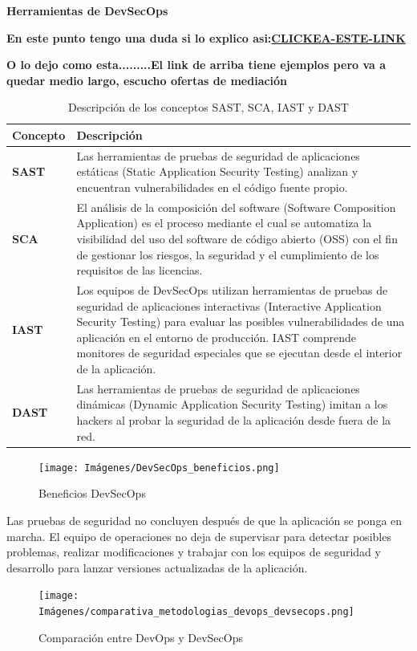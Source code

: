 \textbf{Herramientas de DevSecOps}

\textbf{En este punto tengo una duda si lo explico asi:\href{https://ranjaniitian.medium.com/ensuring-robust-application-security-exploring-sast-dast-and-iast-for-comprehensive-protection-d68b4cf5cf79}{CLICKEA-ESTE-LINK}}

\textbf{O lo dejo como esta.........El link de arriba tiene ejemplos pero va a quedar medio largo, escucho ofertas de mediación}


\begin{table}[ht]
\centering
\begin{tabular}{|m{3cm}|m{11.5cm}|}
\hline
\centering \textbf{Concepto} & \textbf{Descripción} \\ \hline
\centering \textbf{SAST} & Las herramientas de pruebas de seguridad de aplicaciones estáticas (Static Application Security Testing) analizan y encuentran vulnerabilidades en el código fuente propio. \\ \hline
\centering \textbf{SCA} & El análisis de la composición del software (Software Composition Application) es el proceso mediante el cual se automatiza la visibilidad del uso del software de código abierto (OSS) con el fin de gestionar los riesgos, la seguridad y el cumplimiento de los requisitos de las licencias. \\ \hline
\centering \textbf{IAST} & Los equipos de DevSecOps utilizan herramientas de pruebas de seguridad de aplicaciones interactivas (Interactive Application Security Testing) para evaluar las posibles vulnerabilidades de una aplicación en el entorno de producción. IAST comprende monitores de seguridad especiales que se ejecutan desde el interior de la aplicación. \\ \hline
\centering \textbf{DAST} & Las herramientas de pruebas de seguridad de aplicaciones dinámicas (Dynamic Application Security Testing) imitan a los hackers al probar la seguridad de la aplicación desde fuera de la red. \\ \hline
\end{tabular}
\caption{Descripción de los conceptos SAST, SCA, IAST y DAST}
\end{table}


\begin{figure}[ht]
    \centering
    \texttt{[image: Imágenes/DevSecOps\_beneficios.png]}
    \caption{Beneficios DevSecOps}
    \label{fig:beneficiosdevsecops}
\end{figure}

Las pruebas de seguridad no concluyen después de que la aplicación se ponga en marcha. El equipo de operaciones no deja de supervisar para detectar posibles problemas, realizar modificaciones y trabajar con los equipos de seguridad y desarrollo para lanzar versiones actualizadas de la aplicación.


\begin{figure}[ht]
    \centering
    \texttt{[image: Imágenes/comparativa\_metodologias\_devops\_devsecops.png]}
    \caption{Comparación entre DevOps y DevSecOps}
    \label{fig:comparativa_metodologias_devops_devsecops}
\end{figure}
